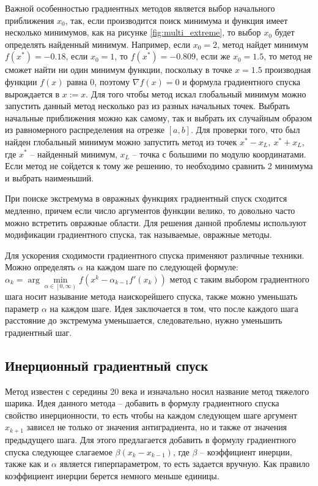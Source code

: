 Важной особенностью градиентных методов является выбор начального приближения $x_0$, так, если производится поиск минимума и функция имеет несколько минимумов, как на рисунке \ref{fig:multi_extreme}, то выбор $x_0$ будет определять найденный минимум. Например, если $x_0 = 2$, метод найдет минимум $f(x^*) = -0.18$, если $x_0 = 1$, то $f(x^*) = -0.809$, если же $x_0 = 1.5$, то метод не сможет найти ни один минимум функции, поскольку в точке $x = 1.5$ производная функции $f(x)$ равна 0, поэтому $\nabla f(x) = 0$ и формула градиентного спуска вырождается в $x := x$. Для того чтобы метод искал глобальный минимум можно запустить данный метод несколько раз из разных начальных точек. Выбрать начальные приближения можно как самому, так и выбрать их случайным образом из равномерного распределения на отрезке $[ a, b ]$. Для проверки того, что был найден глобальный минимум можно запустить метод из точек $x^* - x_L,~x^* + x_L$, где $x^*$ -- найденный минимум, $x_L$ -- точка с большими по модулю координатами. Если метод не сойдется к тому же решению, то необходимо сравнить 2 минимума и выбрать наименьший.

При поиске экстремума в овражных функциях градиентный спуск сходится медленно, причем если число аргументов функции велико, то довольно часто можно встретить овражные области. Для решения данной проблемы используют модификации градиентного спуска, так называемые, овражные методы.

Для ускорения сходимости градиентного спуска применяют различные техники. Можно определять $\alpha$ на каждом шаге по следующей формуле: $\alpha_{k} = \arg \min\limits_{\alpha \in \left[  0, \infty \right) } f(x^k - \alpha_{k-1} f'(x_k))$ метод с таким выбором градиентного шага носит называние метода наискорейшего спуска, также можно уменьшать параметр $\alpha$ на каждом шаге. Идея заключается в том, что после каждого шага расстояние до экстремума уменьшается, следовательно, нужно уменьшить градиентный шаг.


\subsection{Инерционный градиентный спуск}

Метод известен с середины 20 века и изначально носил название метод тяжелого шарика. Идея данного метода -- добавить в формулу градиентного спуска свойство инерционности, то есть чтобы на каждом следующем шаге аргумент $x_{k+1}$ зависел не только от значения антиградиента, но и также от значения предыдущего шага. Для этого предлагается добавить в формулу градиентного спуска следующее слагаемое $\beta (x_k - x_{k-1})$, где $\beta$ -- коэффициент инерции, также как и $\alpha$ является гиперпараметром, то есть задается вручную. Как правило коэффициент инерции берется немного меньше единицы.

